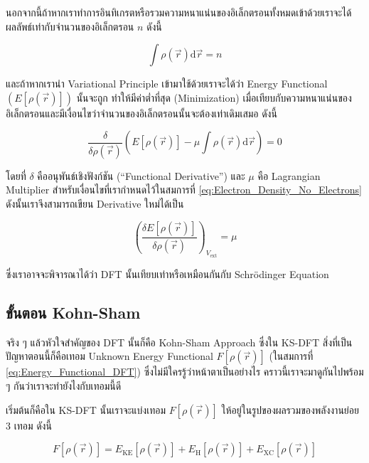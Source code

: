 นอกจากนี้ถ้าหากเราทำการอินทิเกรตหรือรวมความหนาแน่นของอิเล็กตรอนทั้งหมดเข้าด้วยเราจะได้ผลลัพธ์เท่ากับจำนวนของอิเล็กตรอน $n$ ดังนี้

\begin{equation}
  \label{eq:Electron_Density_No_Electrons}
  \int \rho(\vec{r}) \mathrm{d} \vec{r}
  =
  n
\end{equation}

\noindent และถ้าหากเรานำ Variational Principle เข้ามาใช้ด้วยเราจะได้ว่า Energy Functional $(E[\rho(\vec{r})])$ นั้นจะถูก%
ทำให้มีค่าต่ำที่สุด (Minimization) เมื่อเทียบกับความหนาแน่นของอิเล็กตรอนและมีเงื่อนไขว่าจำนวนของอิเล็กตรอนนั้นจะต้องเท่าเดิมเสมอ ดังนี้

\begin{equation}
  \label{eq:Energy_Functional_Minized}
  \frac
  {
    \delta
  }
  {
    \delta \rho(\vec{r})
  }
  \left(
  E[\rho(\vec{r})] - \mu \int \rho(\vec{r}) \mathrm{d} \vec{r}
  \right)
  = 0
\end{equation}

\noindent โดยที่ $\delta$ คืออนุพันธ์เชิงฟังก์ชัน (\enquote{Functional Derivative}) และ $\mu$ คือ Lagrangian Multiplier
สำหรับเงื่อนไขที่เรากำหนดไว้ในสมการที่ \eqref{eq:Electron_Density_No_Electrons} ดังนั้นเราจึงสามารถเขียน Derivative ใหม่ได้เป็น

\begin{equation}
  \left(\frac{\delta E[\rho(\vec{r})]}{\delta \rho(\vec{r})}\right)_{V_{\mathrm{ext}}} = \mu
\end{equation}

\noindent ซึ่งเราอาจจะพิจารณาได้ว่า DFT นั้นเทียบเท่าหรือเหมือนกันกับ Schr\"{o}dinger Equation

\subsection{ขั้นตอน Kohn-Sham}

จริง ๆ แล้วหัวใจสำคัญของ DFT นั้นก็คือ Kohn-Sham Approach ซึ่งใน KS-DFT สิ่งที่เป็นปัญหาตอนนี้ก็คือเทอม Unknown Energy Functional
$F[\rho(\vec{r})]$ (ในสมการที่ \eqref{eq:Energy_Functional_DFT}) ซึ่งไม่มีใครรู้ว่าหน้าตาเป็นอย่างไร คราวนี้เราจะมาดูกันไปพร้อม ๆ
กันว่าเราจะทำยังไงกับเทอมนี้ดี

เริ่มต้นก็คือใน KS-DFT นั้นเราจะแบ่งเทอม $F[\rho(\vec{r})]$ ให้อยู่ในรูปของผลรวมของพลังงานย่อย 3 เทอม ดังนี้

\begin{equation}
  F[\rho(\vec{r})]
  =
  E_{\text{KE}}[\rho(\vec{r})]
  + E_{\text{H}}[\rho(\vec{r})]
  + E_{\text{XC}}[\rho(\vec{r})]
\end{equation}

